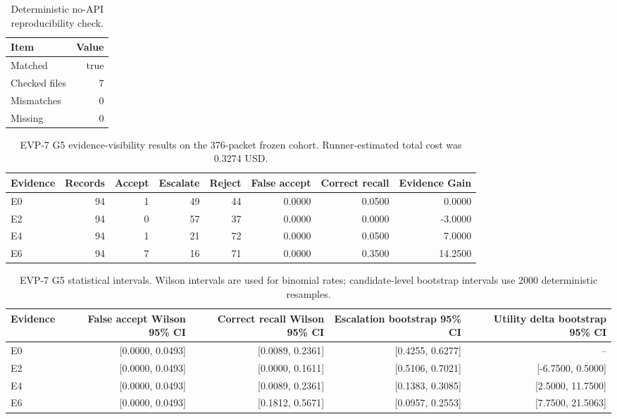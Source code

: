 \documentclass[conference]{IEEEtran}
\begin{document}
\begin{table}[t]
\centering
\caption{Deterministic no-API reproducibility check.}
\label{tab:reproducibility}
\begin{tabular}{lr}
\toprule
Item & Value \\
\midrule
Matched & true \\
Checked files & 7 \\
Mismatches & 0 \\
Missing & 0 \\
\bottomrule
\end{tabular}
\end{table}


\begin{table}[t]
\centering
\caption{EVP-7 G5 evidence-visibility results on the 376-packet frozen cohort. Runner-estimated total cost was 0.3274 USD.}
\label{tab:evp7-g5-results}
\begin{tabular}{lrrrrrrr}
\toprule
Evidence & Records & Accept & Escalate & Reject & False accept & Correct recall & Evidence Gain \\
\midrule
E0 & 94 & 1 & 49 & 44 & 0.0000 & 0.0500 & 0.0000 \\
E2 & 94 & 0 & 57 & 37 & 0.0000 & 0.0000 & -3.0000 \\
E4 & 94 & 1 & 21 & 72 & 0.0000 & 0.0500 & 7.0000 \\
E6 & 94 & 7 & 16 & 71 & 0.0000 & 0.3500 & 14.2500 \\
\bottomrule
\end{tabular}
\end{table}


\begin{table}[t]
\centering
\caption{EVP-7 G5 statistical intervals. Wilson intervals are used for binomial rates; candidate-level bootstrap intervals use 2000 deterministic resamples.}
\label{tab:evp7-statistical-intervals}
\begin{tabular}{lrrrr}
\toprule
Evidence & False accept Wilson 95\% CI & Correct recall Wilson 95\% CI & Escalation bootstrap 95\% CI & Utility delta bootstrap 95\% CI \\
\midrule
E0 & [0.0000, 0.0493] & [0.0089, 0.2361] & [0.4255, 0.6277] & -- \\
E2 & [0.0000, 0.0493] & [0.0000, 0.1611] & [0.5106, 0.7021] & [-6.7500, 0.5000] \\
E4 & [0.0000, 0.0493] & [0.0089, 0.2361] & [0.1383, 0.3085] & [2.5000, 11.7500] \\
E6 & [0.0000, 0.0493] & [0.1812, 0.5671] & [0.0957, 0.2553] & [7.7500, 21.5063] \\
\bottomrule
\end{tabular}
\end{table}
\end{document}
